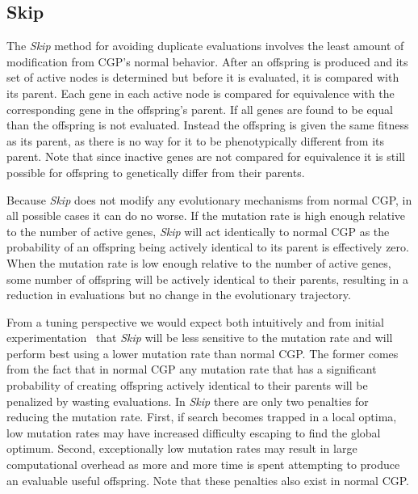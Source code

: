 \documentclass[journal]{IEEEtran}
\begin{document}
\subsection{Skip}
The \emph{Skip} method for avoiding duplicate evaluations involves the least
amount of modification from CGP's normal behavior.  After an offspring is produced
and its set of active nodes is determined but before it is evaluated, it is compared
with its parent.  Each gene in each active node is compared for equivalence with
the corresponding gene in the offspring's parent.  If all genes are found to be equal
than the offspring is not evaluated.  Instead the offspring is given the same fitness
as its parent, as there is no way for it to be phenotypically different from its parent.
Note that since inactive genes are not compared for equivalence it is still possible
for offspring to genetically differ from their parents.

Because \emph{Skip} does not modify any evolutionary mechanisms from normal CGP,
in all possible cases it can do no worse.  If the mutation rate is high enough relative
to the number of active genes, \emph{Skip} will act identically to normal CGP as
the probability of an offspring being actively identical to its parent is effectively zero.
When the mutation rate is low enough relative to the number of active genes, some number of
offspring will be actively identical to their parents, resulting in a reduction in evaluations
but no change in the evolutionary trajectory.

From a tuning perspective we would expect both intuitively and from initial
experimentation~\cite{goldman:2013:cgpwaste} that \emph{Skip} will be less sensitive
to the mutation rate and will perform best using a lower mutation rate than normal CGP.
The former comes from the fact that in normal CGP any mutation rate that has a significant
probability of creating offspring actively identical to their parents will be penalized
by wasting evaluations.  In \emph{Skip} there are only two penalties for reducing the
mutation rate.  First, if search becomes trapped in a local optima, low mutation
rates may have increased difficulty escaping to find the global optimum.  Second,
exceptionally low mutation rates may result in large computational overhead as
more and more time is spent attempting to produce an evaluable useful offspring.
Note that these penalties also exist in normal CGP.
\end{document}
